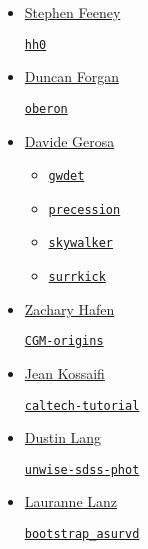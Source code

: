 \documentclass[11pt,a4paper]{article}
\begin{document}
\begin{itemize}
\item \href{https://github.com/sfeeney}{Stephen Feeney}
  \begin{itemize}
    \href{https://github.com/sfeeney/hh0}{{\tt hh0}}
  \end{itemize}

\item \href{https://github.com/dh4gan/}{Duncan Forgan}
  \begin{itemize}
    \href{https://github.com/dh4gan/oberon}{\tt oberon}
  \end{itemize}

\item \href{https://github.com/dgerosa/}{Davide Gerosa}
  \begin{itemize}
   \item \href{https://github.com/dgerosa/gwdet}{\tt gwdet}
   \item \href{https://github.com/dgerosa/precession}{\tt precession}
   \item \href{https://github.com/dgerosa/skywalker}{\tt skywalker}
   \item \href{https://github.com/dgerosa/surrkick}{\tt surrkick}

  \end{itemize}

\item \href{https://github.com/zhafen/}{Zachary Hafen} 
  \begin{itemize}
    \href{https://github.com/zhafen/CGM-origins}{\tt CGM-origins}
  \end{itemize}

\item \href{https://github.com/JeanKossaifi}{Jean Kossaifi}
  \begin{itemize}
    \href{https://github.com/JeanKossaifi/caltech-tutorial}{{\tt caltech-tutorial}}
  \end{itemize}
  
\item \href{https://github.com/dstndstn}{Dustin Lang}
  \begin{itemize}
   \href{https://github.com/dstndstn/unwise-sdss-phot}{\tt unwise-sdss-phot}
   \end{itemize}

\item \href{https://github.com/lalanz/}{Lauranne Lanz}
  \begin{itemize}
    \href{https://github.com/lalanz/bootstrap\_asurv}{\tt bootstrap\_asurvd}
  \end{itemize}


\end{itemize}
\end{document}
